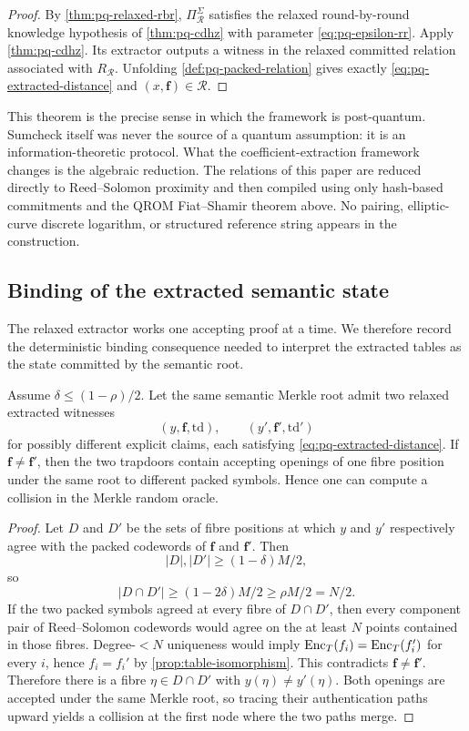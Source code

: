 \begin{proof}
By \cref{thm:pq-relaxed-rbr}, $\Pi_{\mathcal R}^{\Sigma}$ satisfies the relaxed round-by-round knowledge hypothesis of \cref{thm:pq-cdhz} with parameter \eqref{eq:pq-epsilon-rr}.  Apply \cref{thm:pq-cdhz}.  Its extractor outputs a witness in the relaxed committed relation associated with $R_{\mathcal R}$.  Unfolding \cref{def:pq-packed-relation} gives exactly \eqref{eq:pq-extracted-distance} and $(x,\mathbf f)\in\mathcal R$.
\end{proof}

This theorem is the precise sense in which the framework is post-quantum.  Sumcheck itself was never the source of a quantum assumption: it is an information-theoretic protocol.  What the coefficient-extraction framework changes is the algebraic reduction.  The relations of this paper are reduced directly to Reed--Solomon proximity and then compiled using only hash-based commitments and the QROM Fiat--Shamir theorem above.  No pairing, elliptic-curve discrete logarithm, or structured reference string appears in the construction.

\subsection{Binding of the extracted semantic state}
\label{sec:pq-binding}

The relaxed extractor works one accepting proof at a time.  We therefore record the deterministic binding consequence needed to interpret the extracted tables as the state committed by the semantic root.

\begin{lemma}
\label{lem:pq-root-binding}
Assume $\delta\le(1-\rho)/2$.  Let the same semantic Merkle root admit two relaxed extracted witnesses
\[
  (y,\mathbf f,\mathrm{td}),
  \qquad
  (y',\mathbf f',\mathrm{td}')
\]
for possibly different explicit claims, each satisfying \eqref{eq:pq-extracted-distance}.  If $\mathbf f\ne\mathbf f'$, then the two trapdoors contain accepting openings of one fibre position under the same root to different packed symbols.  Hence one can compute a collision in the Merkle random oracle.
\end{lemma}

\begin{proof}
Let $D$ and $D'$ be the sets of fibre positions at which $y$ and $y'$ respectively agree with the packed codewords of $\mathbf f$ and $\mathbf f'$.  Then
\[
  |D|,|D'|\ge(1-\delta)M/2,
\]
so
\[
  |D\cap D'|\ge(1-2\delta)M/2\ge \rho M/2=N/2.
\]
If the two packed symbols agreed at every fibre of $D\cap D'$, then every component pair of Reed--Solomon codewords would agree on the at least $N$ points contained in those fibres.  Degree-$<N$ uniqueness would imply $\operatorname{Enc}_T(f_i)=\operatorname{Enc}_T(f_i')$ for every $i$, hence $f_i=f_i'$ by \cref{prop:table-isomorphism}.  This contradicts $\mathbf f\ne\mathbf f'$.  Therefore there is a fibre $\eta\in D\cap D'$ with $y(\eta)\ne y'(\eta)$.  Both openings are accepted under the same Merkle root, so tracing their authentication paths upward yields a collision at the first node where the two paths merge.
\end{proof}

